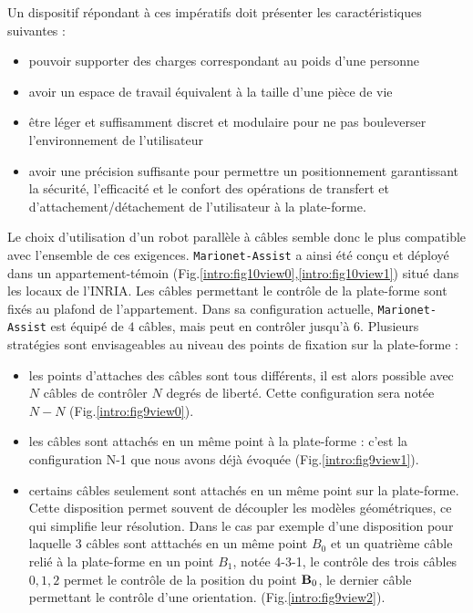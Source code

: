 Un dispositif répondant à ces impératifs doit présenter les caractéristiques 
suivantes :
\begin{itemize}
 \item pouvoir supporter des charges correspondant au poids d'une personne
 \item avoir un espace de travail équivalent à la taille d'une pièce de vie
 \item être léger et suffisamment discret et modulaire pour ne pas bouleverser 
l'environnement de l'utilisateur
 \item avoir une précision suffisante pour permettre un positionnement 
garantissant la sécurité, l'efficacité et le confort des opérations de 
transfert 
et d'attachement/détachement de l'utilisateur à la plate-forme.
\end{itemize}

Le choix d'utilisation d'un robot parallèle à câbles semble donc le plus 
compatible avec l'ensemble de ces exigences. {\tt Marionet-Assist} a ainsi été 
conçu et déployé dans un appartement-témoin 
(Fig.\ref{intro:fig10view0},\ref{intro:fig10view1}) situé dans les locaux 
de l'INRIA. Les câbles permettant le contrôle de la plate-forme sont fixés au 
plafond de l'appartement. Dans sa configuration actuelle, {\tt Marionet-Assist} 
est équipé de $4$ câbles, mais peut en contrôler jusqu'à $6$. Plusieurs 
stratégies sont envisageables au niveau des points de fixation sur la 
plate-forme :
\begin{itemize}
 \item les points d'attaches des câbles sont tous différents, il est alors 
possible avec $N$ câbles de contrôler $N$ degrés de liberté. Cette 
configuration sera notée $N-N$ (Fig.\ref{intro:fig9view0}).
 \item les câbles sont attachés en un même point à la plate-forme : c'est la configuration N-1 que nous avons déjà évoquée (Fig.\ref{intro:fig9view1}).
 \item certains câbles seulement sont attachés en un même point sur la 
plate-forme. Cette disposition permet souvent de découpler les modèles géométriques, ce qui simplifie leur résolution. Dans le cas par exemple d'une disposition pour laquelle $3$ câbles sont atttachés en un même point $B_0$ et un quatrième câble relié à la 
plate-forme en un point $B_1$, notée 4-3-1, le contrôle des trois câbles $0, 1, 2$ permet le contrôle de la position du point ${\bf B}_0$, le dernier câble permettant le contrôle d'une orientation. 
(Fig.\ref{intro:fig9view2}).
\end{itemize}


